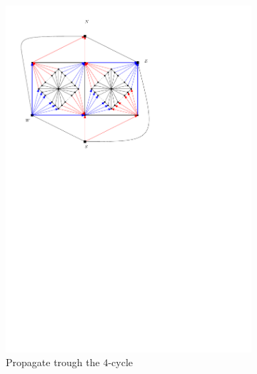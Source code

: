 \begin{figure}[h]
\begin{subfigure}[t]{0.3\textwidth}
      \includegraphics[width=\textwidth]{fixExtension/img/manymany2}
      \caption{Propagate trough the $4$-cycle}
      \label{fig:fix:manymany2}
    \end{subfigure}
    \quad
    \begin{subfigure}[t]{0.3\textwidth}

\end{subfigure}
\end{figure}
